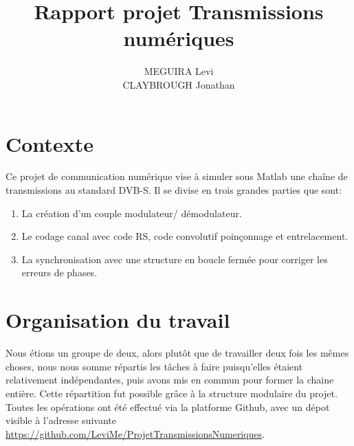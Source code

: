 \documentclass[a4paper,11pt]{article}
\title{Rapport projet Transmissions numériques}
\author{MEGUIRA Levi \\
	CLAYBROUGH Jonathan}
\begin{document}
\maketitle


\begin{comment}
	\textbf{Remarque importante: Notre chaine de transmission ne \emph{donne pas l'air} de transmettre \emph{un} signal complexe mais bien deux signaux distincts qui subissent exactement les mêmes opérations. Afin de respecter au possible le schéma de l'énoncé ainsi que le principe de ne jamais répeter de code en Matlab, il importe de créer un signal numérique \emph{réelement complexe} (sans jeu de mot) à partir des bits de départ et de transmettre un seul et même objet d'une extrémité à l'autre. \\ Le caractère universel des fonctions Matlab suffit à faire appliquer toutes les fonctions utilisés dans ce code à un vecteur complexe définie par \texttt{symboles=bitsI+j*bitsQ}}
\end{comment}



\section*{Contexte}
Ce projet de communication numérique vise à simuler sous Matlab une chaîne de transmissions au standard DVB-S. Il se divise en trois grandes parties que sont:
\begin{enumerate}
	\item La création d'un couple modulateur/ démodulateur.
	\item Le codage canal avec code RS, code convolutif poinçonnage et entrelacement.
	\item La synchronisation avec une structure en boucle fermée pour corriger les erreurs de phases.
\end{enumerate}

\tableofcontents

\section{Organisation du travail}
Nous étions un groupe de deux, alors plutôt que de travailler deux fois les mêmes choses, nous nous somme répartis les tâches à faire puisqu'elles étaient relativement indépendantes, puis avons mis en commun pour former la chaine entière.
\newline
Cette répartition fut possible grâce à la structure modulaire du projet. Toutes les opérations ont été effectué via la platforme Github, avec un dépot visible à l'adresse suivante \url{https://github.com/LeviMe/ProjetTransmissionsNumeriques}.
\end{document}
